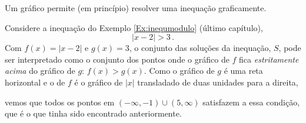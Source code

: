Um gráfico permite (em princípio) resolver uma inequação graficamente. 
\begin{ex}
Considere a inequação do Exemplo \ref{Ex:inequmodulo} (último capítulo),
$$|x-2|>3\,.$$
Com $f(x)=|x-2|$ e $g(x)=3$, o conjunto das soluções da inequação, $S$, pode ser
interpretado como o conjunto dos pontos onde o gráfico de $f$ fica
\emph{estritamente acima} do gráfico de $g$: $f(x)>g(x)$. Como o gráfico de $g$
é uma reta horizontal e 
o de $f$ é o gráfico de $|x|$ transladado de duas unidades para a direita,
\begin{center}
\begin{bmlimage}\end{bmlimage}
\end{center}
vemos que todos os pontos em $(-\infty,-1)\cup (5,\infty)$ satisfazem a essa condição, que
é o que tinha sido encontrado anteriormente.
\end{ex}

